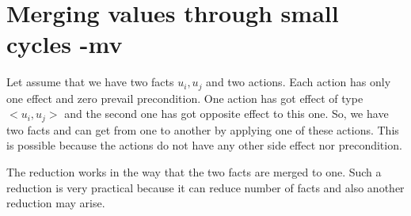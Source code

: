 	\chapter{Merging values through small cycles -mv}
	
	Let assume that we have two facts $u_i, u_j$ and two actions. Each action has only one effect and zero prevail precondition. One action has got effect of type $<u_i,u_j>$ and the second one has got opposite effect to this one. So, we have two facts and can get from one to another by applying one of these actions. This is possible because the actions do not have any other side effect nor precondition. 
	
	The reduction works in the way that the two facts are merged to one. Such a reduction is very practical because it can reduce number of facts and also another reduction may arise.
	
